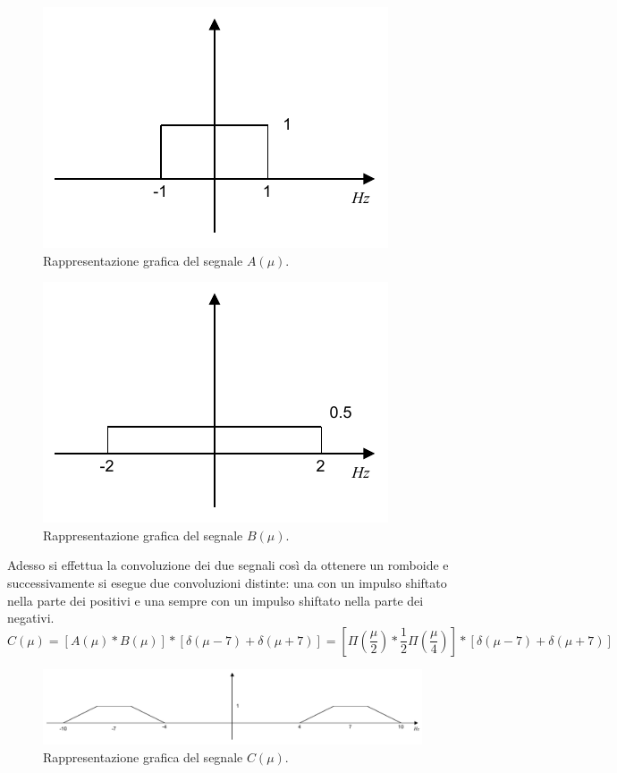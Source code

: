 \documentclass[a4paper]{article}
\begin{document}
	\begin{figure}[!htp]
		\centering
		\includegraphics[width=.4\textwidth]{img/fig_4.pdf}
		\caption*{Rappresentazione grafica del segnale $A\left(\mu\right)$.}
	\end{figure}
	
	\begin{figure}[!htp]
		\centering
		\includegraphics[width=.4\textwidth]{img/fig_5.pdf}
		\caption*{Rappresentazione grafica del segnale $B\left(\mu\right)$.}
	\end{figure}
	
	\noindent
	Adesso si effettua la convoluzione dei due segnali così da ottenere un romboide e successivamente si esegue due convoluzioni distinte: una con un impulso shiftato nella parte dei positivi e una sempre con un impulso shiftato nella parte dei negativi.
	\begin{equation*}
		C\left(\mu\right) = \left[A\left(\mu\right) * B\left(\mu\right)\right] * \left[\delta\left(\mu - 7\right) + \delta\left(\mu + 7\right)\right] =
		\left[\Pi\left(\dfrac{\mu}{2}\right) * \dfrac{1}{2}\Pi\left(\dfrac{\mu}{4}\right)\right] * \left[\delta\left(\mu - 7\right) + \delta\left(\mu + 7\right)\right]
	\end{equation*}
	\begin{figure}[!htp]
		\centering
		\includegraphics[width=\textwidth]{img/fig_6.pdf}
		\caption*{Rappresentazione grafica del segnale $C\left(\mu\right)$.}
	\end{figure}\newpage
	
\end{document}

